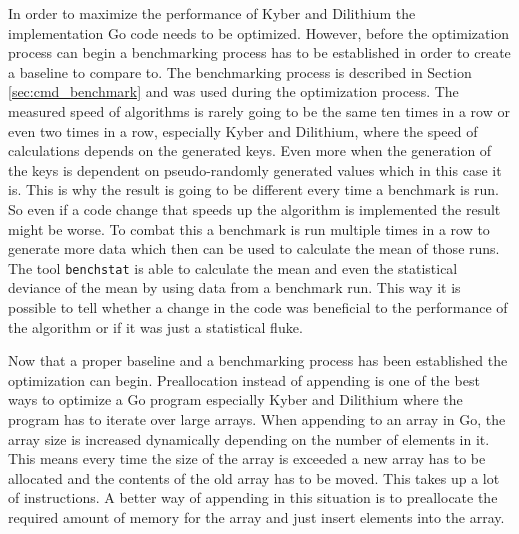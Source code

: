 In order to maximize the performance of Kyber and Dilithium the implementation Go code needs to be optimized. However, before the optimization process can begin a benchmarking process has to be established in order to create a baseline to compare to. The benchmarking process is described in Section \ref{sec:cmd_benchmark} and was used during the optimization process. The measured speed of algorithms is rarely going to be the same ten times in a row or even two times in a row, especially Kyber and Dilithium, where the speed of calculations depends on the generated keys. Even more when the generation of the keys is dependent on pseudo-randomly generated values which in this case it is. This is why the result is going to be different every time a benchmark is run. So even if a code change that speeds up the algorithm is implemented the result might be worse. To combat this a benchmark is run multiple times in a row to generate more data which then can be used to calculate the mean of those runs. The tool \texttt{benchstat} is able to calculate the mean and even the statistical deviance of the mean by using data from a benchmark run. This way it is possible to tell whether a change in the code was beneficial to the performance of the algorithm or if it was just a statistical fluke.

Now that a proper baseline and a benchmarking process has been established the optimization can begin. Preallocation instead of appending is one of the best ways to optimize a Go program especially Kyber and Dilithium where the program has to iterate over large arrays. When appending to an array in Go, the array size is increased dynamically depending on the number of elements in it. This means every time the size of the array is exceeded a new array has to be allocated and the contents of the old array has to be moved. This takes up a lot of instructions. A better way of appending in this situation is to preallocate the required amount of memory for the array and just insert elements into the array.

